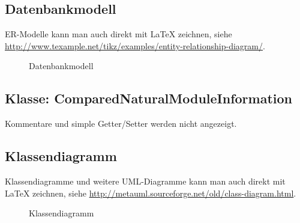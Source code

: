 

\subsection{Datenbankmodell}
\label{app:Datenbankmodell}
ER-Modelle kann man auch direkt mit \LaTeX{} zeichnen, siehe \zB \url{http://www.texample.net/tikz/examples/entity-relationship-diagram/}.
\begin{figure}[htb]
\centering
{}
\caption{Datenbankmodell}
\end{figure}
\clearpage



\clearpage


\subsection{Klasse: ComparedNaturalModuleInformation}
\label{app:CNMI}
Kommentare und simple Getter/Setter werden nicht angezeigt.

\clearpage

\subsection{Klassendiagramm}
\label{app:Klassendiagramm}
Klassendiagramme und weitere \acs{UML}-Diagramme kann man auch direkt mit \LaTeX{} zeichnen, siehe \zB \url{http://metauml.sourceforge.net/old/class-diagram.html}.
\begin{figure}[htb]
\centering
{}
\caption{Klassendiagramm}
\end{figure}
\clearpage


